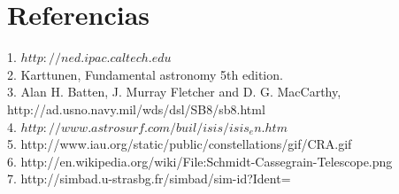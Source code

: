 \documentclass[Proceedings]{ascelike}
\begin{document}
\section{Referencias}

1. $http://ned.ipac.caltech.edu$  \\
2. Karttunen, Fundamental astronomy 5th edition.\\
3. Alan H. Batten, J. Murray Fletcher and D. G. MacCarthy, http://ad.usno.navy.mil/wds/dsl/SB8/sb8.html\\
4. $http://www.astrosurf.com/buil/isis/isis_en.htm$\\
5. http://www.iau.org/static/public/constellations/gif/CRA.gif \\
6. http://en.wikipedia.org/wiki/File:Schmidt-Cassegrain-Telescope.png \\
7. http://simbad.u-strasbg.fr/simbad/sim-id?Ident=%
\end{document}
